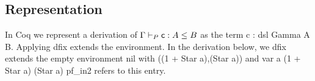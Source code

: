 \subsection{Representation}
In Coq we represent a derivation of $\Gamma \vdash_P \mathsf{c} : A \leq B$ as the term  \textsf{c : dsl Gamma A B}.
Applying \textsf{dfix} extends the environment. In the derivation below, we \textsf{dfix} extends the empty environment \textsf{nil} with \textsf{((1 + Star a),(Star a))} and \textsf{var a (1 + Star a) (Star a) pf\_in2} refers to this entry.








